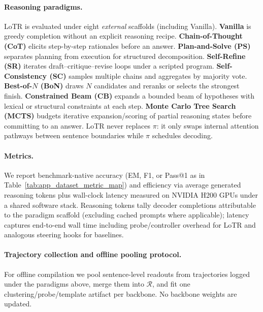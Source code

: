 \paragraph{Reasoning paradigms.}
LoTR is evaluated under eight \emph{external} scaffolds (including Vanilla).
\textbf{Vanilla} is greedy completion without an explicit reasoning recipe.
\textbf{Chain-of-Thought (CoT)} \citep{wei2022chain} elicits step-by-step rationales before an answer.
\textbf{Plan-and-Solve (PS)} \citep{wang2023plan} separates planning from execution for structured decomposition.
\textbf{Self-Refine (SR)} \citep{madaan2023selfrefine} iterates draft--critique--revise loops under a scripted program.
\textbf{Self-Consistency (SC)} \citep{wang2023selfconsistency} samples multiple chains and aggregates by majority vote.
\textbf{Best-of-$N$ (BoN)} \citep{chow2024inferenceaware,lightman2024verify} draws \(N\) candidates and reranks or selects the strongest finish.
\textbf{Constrained Beam (CB)} \citep{hokamp2017lexically,post2018fast} expands a bounded beam of hypotheses with lexical or structural constraints at each step.
\textbf{Monte Carlo Tree Search (MCTS)} \citep{xie2024mcts} budgets iterative expansion/scoring of partial reasoning states before committing to an answer.
LoTR never replaces \(\pi\): it only swaps internal attention pathways between sentence boundaries while \(\pi\) schedules decoding.

\paragraph{Metrics.}
We report benchmark-native accuracy (EM, F1, or Pass@1 as in Table~\ref{tab:app_dataset_metric_map}) and efficiency via average generated reasoning tokens plus wall-clock latency measured on NVIDIA H200 GPUs under a shared software stack. Reasoning tokens tally decoder completions attributable to the paradigm scaffold (excluding cached prompts where applicable); latency captures end-to-end wall time including probe/controller overhead for LoTR and analogous steering hooks for baselines.

\paragraph{Trajectory collection and offline pooling protocol.}
For offline compilation we pool sentence-level readouts from trajectories logged under the paradigms above, merge them into \(\mathcal{R}\), and fit one clustering/probe/template artifact per backbone.
No backbone weights are updated.

